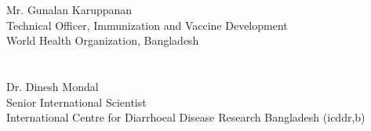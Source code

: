 

\begin{cvparagraph}

\begin{multicols}{2}
Mr. Gunalan Karuppanan\\
Technical Officer, Immunization and Vaccine Development\\
World Health Organization, Bangladesh \\
\\
\columnbreak
\\Dr. Dinesh Mondal\\
Senior International Scientist\\
International Centre for Diarrhoeal Disease Research Bangladesh (icddr,b)\\
\\
\end{multicols}


\end{cvparagraph}

